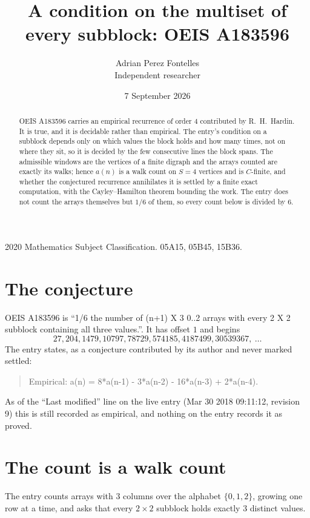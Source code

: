 \documentclass[11pt,a4paper]{article}
\title{A condition on the multiset of every subblock: OEIS A183596}
\author{Adrian Perez Fontelles\\ \small Independent researcher}
\date{7 September 2026}
\theoremstyle{plain}
\theoremstyle{definition}
\begin{document}
\maketitle

\begin{abstract}
OEIS A183596 carries an empirical recurrence of order $4$ contributed by R.~H.~Hardin. It is
true, and it is decidable rather than empirical. The entry's condition on a subblock depends
only on which values the block holds and how many times, not on where they sit, so it is
decided by the few consecutive lines the block spans. The admissible windows are the vertices
of a finite digraph and the arrays counted are exactly its walks; hence $a(n)$ is a walk count
on $S=4$ vertices and is $C$-finite, and whether the conjectured recurrence annihilates it
is settled by a finite exact computation, with the Cayley--Hamilton theorem bounding the
work. The entry does not count the arrays themselves but $1/6$ of them, so every count below is divided by $6$.
\end{abstract}

\noindent\small 2020 Mathematics Subject Classification. 05A15, 05B45, 15B36.\normalsize

\section{The conjecture}

OEIS A183596 is ``1/6 the number of (n+1) X 3 0..2 arrays with every 2 X 2 subblock containing all three values.''. It has offset $1$ and begins
\[
27, 204, 1479, 10797, 78729, 574185, 4187499, 30539367,\ \dots
\]
The entry states, as a conjecture contributed by its author and never marked settled:
\begin{quote}
Empirical: a(n) = 8*a(n-1) - 3*a(n-2) - 16*a(n-3) + 2*a(n-4).
\end{quote}
As of the ``Last modified'' line on the live entry (Mar 30 2018 09:11:12, revision 9) this is still
recorded as empirical, and nothing on the entry records it as proved.

\section{The count is a walk count}

The entry counts arrays with $3$ columns over the alphabet $\{0,1,2\}$, growing one row at a time, and asks that every $2\times2$ subblock holds exactly $3$ distinct values.
\end{document}

